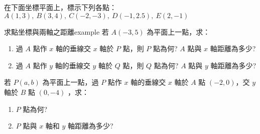 \documentclass[bwprint,a4paper]{extarticle}
\begin{document}
\begin{observing}
	在下面坐標平面上，標示下列各點：\\[12pt]
	$A(1,3),\ B(3,4),\ C(-2,-3),\ D(-1,2.5),\ E(2,-1)$\\[12pt]
	
\end{observing}
\begin{question}{求點坐標與兩軸之距離}{example}
	若 $A(-3,5)$ 為平面上一點，求：
	\begin{enumerate}[label=(\arabic*)]
		\item 過 $A$ 點作 $x$ 軸的垂線交 $x$ 軸於 $P$ 點，則 $P$ 點為何? $A$ 點與 $x$ 軸距離為多少?
		\item 過 $A$ 點作 $y$ 軸的垂線交 $y$ 軸於 $Q$ 點，則 $Q$ 點為何? $A$ 點與 $y$ 軸距離為多少?
	\end{enumerate}
\end{question}
\vspace{15ex}
\begin{observing}
	若 $P(a,b)$ 為平面上一點，過 $P$ 點作 $x$ 軸的垂線交 $x$ 軸於 $A$ 點 $(-2,0)$，交 $y$ 軸於 $B$ 點 $(0,-4)$ ，求：
	\begin{enumerate}[label=(\arabic*)]
		\item $P$ 點為何? 
		\item $P$ 點與 $x$ 軸和 $y$ 軸距離為多少?
	\end{enumerate}
\end{observing}
\vspace{20ex}
\end{document}
